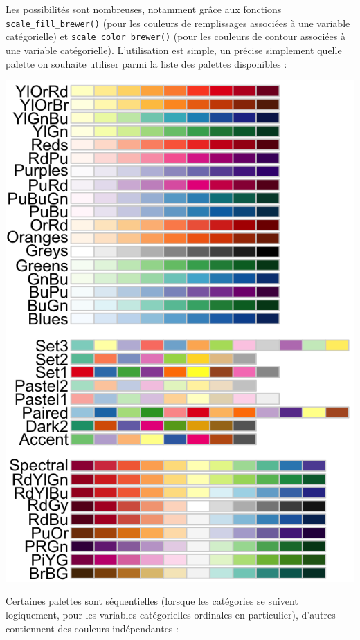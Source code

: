 \documentclass[
  letterpaper,
  DIV=11,
  numbers=noendperiod]{scrreprt}
\begin{document}
Les possibilités sont nombreuses, notamment grâce aux fonctions
\texttt{scale\_fill\_brewer()} (pour les couleurs de remplissages
associées à une variable catégorielle) et
\texttt{scale\_color\_brewer()} (pour les couleurs de contour associées
à une variable catégorielle). L'utilisation est simple, un précise
simplement quelle palette on souhaite utiliser parmi la liste des
palettes disponibles :

\includegraphics{./images/brewer.png}

Certaines palettes sont séquentielles (lorsque les catégories se suivent
logiquement, pour les variables catégorielles ordinales en particulier),
d'autres contiennent des couleurs indépendantes :
\end{document}
